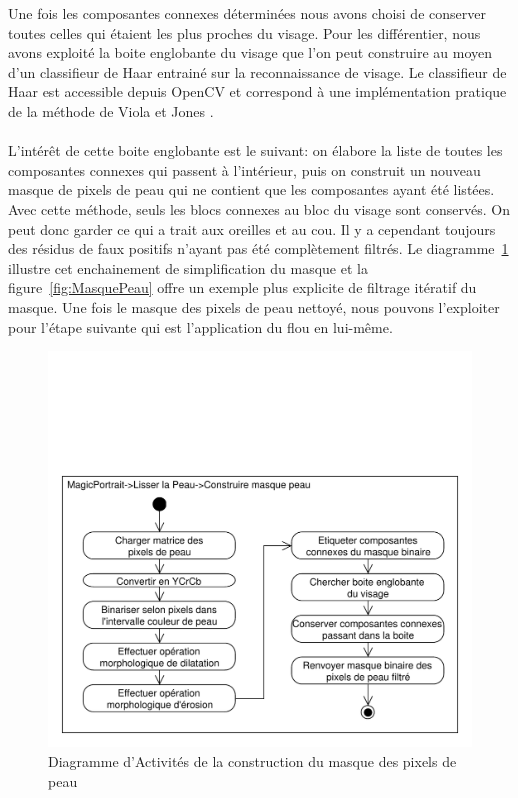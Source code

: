 \documentclass[11pt, french]{report-rd-info}
\begin{document}
Une fois les composantes connexes déterminées nous avons choisi de conserver toutes celles qui étaient les plus proches du visage. Pour les différentier, nous avons exploité la boite englobante du visage que l'on peut construire au moyen d'un classifieur de Haar entrainé sur la reconnaissance de visage. Le classifieur de Haar est accessible depuis OpenCV et correspond à une implémentation pratique de la méthode de Viola et Jones \cite{Viola2004}.

\paragraph*{}
L'intérêt de cette boite englobante est le suivant: on élabore la liste de toutes les composantes connexes qui passent à l'intérieur, puis on construit un nouveau masque de pixels de peau qui ne contient que les composantes ayant été listées. Avec cette méthode, seuls les blocs connexes au bloc du visage sont conservés. On peut donc garder ce qui a trait aux oreilles et au cou. Il y a cependant toujours des résidus de faux positifs n'ayant pas été complètement filtrés. Le diagramme~\ref{diag:diagramme11} illustre cet enchainement de simplification du masque et la figure~\ref{fig:MasquePeau} offre un exemple plus explicite de filtrage itératif du masque. Une fois le masque des pixels de peau nettoyé, nous pouvons l'exploiter pour l'étape suivante qui est l'application du flou en lui-même.


\begin{figure}
\centering
\includegraphics[scale=0.5]{Diagrammes/DiagrammeActivites_11_LissagePeau_Masque}
\caption{Diagramme d'Activités de la construction du masque des pixels de peau}
\label{diag:diagramme11}
\end{figure}
\end{document}
